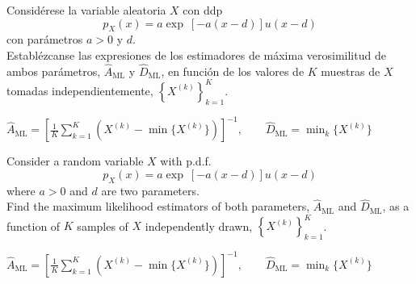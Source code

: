 \ifspanish

\question Considérese la variable aleatoria $X$ con ddp
$$p_X(x) = a\exp\ [-a(x-d) ]u(x-d)$$
con parámetros $a>0$ y $d$.\\
Establézcanse las expresiones de los estimadores de máxima verosimilitud de ambos parámetros, $\hat{A}_\text{ML}$ y $\hat{D}_\text{ML}$, en funci\'{o}n de los valores de $K$ muestras de $X$ tomadas independientemente, $\left\{X^{(k)}\right\}^{K}_{k=1}$.

\begin{solution}
$\hat{A}_\text{ML}=\left[\displaystyle\frac{1}{K}\displaystyle\sum^{K}_{k=1}\left(X^{(k)}-\min\{X^{(k)}\}\right)\right]^{-1}, \quad  \quad  \hat{D}_\text{ML}=\min_{k}\{X^{(k)}\}$ 
  \end{solution}

\else

\question Consider a random variable $X$ with p.d.f.
$$p_X(x) = a\exp\ [-a(x-d) ]u(x-d)$$
where $a>0$ and $d$ are two parameters.\\
Find the maximum likelihood estimators of both parameters, $\hat{A}_\text{ML}$ and $\hat{D}_\text{ML}$, as a function of $K$ samples of $X$ independently drawn, $\left\{X^{(k)}\right\}^{K}_{k=1}$.

\begin{solution}
$\hat{A}_\text{ML}=\left[\displaystyle\frac{1}{K}\displaystyle\sum^{K}_{k=1}\left(X^{(k)}-\min\{X^{(k)}\}\right)\right]^{-1}, \quad  \quad  \hat{D}_\text{ML}=\min_{k}\{X^{(k)}\}$ 
\end{solution}

\fi
